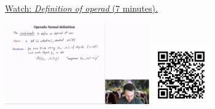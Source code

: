 
\begin{minipage}{10cm}
    \href{https://act4e-spring21.netlify.app/videos/spring2021-operads-a:operad-def.html}{Watch: \emph{Definition of operad} (7 minutes).}
        
    \href{https://act4e-spring21.netlify.app/videos/spring2021-operads-a:operad-def.html}{\includegraphics[height=3.5cm]{spring2021-operads-a:operad-def/thumbnails.jpg}}
    \href{https://act4e-spring21.netlify.app/videos/spring2021-operads-a:operad-def.html}{\includegraphics[height=2.5cm]{spring2021-operads-a:operad-def/qrcode.png}}
\end{minipage}
